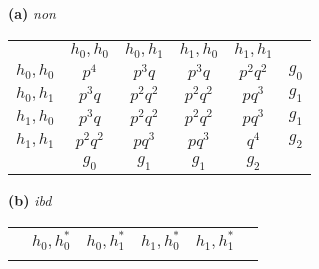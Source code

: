 \begin{table}[!h]
\begin{minipage}{0.5\textwidth}\renewcommand{\arraystretch}{1.5}
\quad\textbf{(a)} \emph{non} \\[0.25em]
\begin{tabular}[t]{c|c|c|c|c|c}
\multicolumn{1}{c}{\rule[-1.5ex]{0pt}{0pt}} &
\multicolumn{1}{c}{$h_{0}, h_{0}$} &
\multicolumn{1}{c}{$h_{0}, h_{1}$} &
\multicolumn{1}{c}{$h_{1}, h_{0}$} &
\multicolumn{1}{c}{$h_{1}, h_{1}$} &
\multicolumn{1}{c}{} \\ \cline{2-5}
\rule{0pt}{3ex}\rule[-2ex]{0pt}{0pt}
  $h_{0}, h_{0}$   & $p^{4}$       & $p^{3}q$      & $p^{3}q$      & $p^{2}q^{2}$ & $g_{0}$ \\ \cline{2-5}
\rule{0pt}{3ex}\rule[-2ex]{0pt}{0pt}
  $h_{0}, h_{1}$   & $p^{3}q$      & $p^{2}q^{2}$  & $p^{2}q^{2}$  & $pq^{3}$     & $g_{1}$ \\ \cline{2-5}
\rule{0pt}{3ex}\rule[-2ex]{0pt}{0pt}
  $h_{1}, h_{0}$   & $p^{3}q$      & $p^{2}q^{2}$  & $p^{2}q^{2}$  & $pq^{3}$     & $g_{1}$ \\ \cline{2-5}
\rule{0pt}{3ex}\rule[-2ex]{0pt}{0pt}
  $h_{1}, h_{1}$   & $p^{2}q^{2}$  & $pq^{3}$      & $pq^{3}$      & $q^{4}$      & $g_{2}$ \\ \cline{2-5}
\multicolumn{1}{c}{} &
\multicolumn{1}{c}{$g_{0}$} &
\multicolumn{1}{c}{$g_{1}$} &
\multicolumn{1}{c}{$g_{1}$} &
\multicolumn{1}{c}{$g_{2}$} &
\multicolumn{1}{c}{}
\end{tabular}
\end{minipage}
%
\begin{minipage}{0.5\textwidth}\renewcommand{\arraystretch}{1.5}
\quad\textbf{(b)} \emph{ibd} \\[0.25em]
\begin{tabular}[t]{c|c|c|c|c|c}
\multicolumn{1}{c}{\rule[-1.5ex]{0pt}{0pt}} &
\multicolumn{1}{c}{$h_{0}, h^*_{0}$} &
\multicolumn{1}{c}{$h_{0}, h^*_{1}$} &
\multicolumn{1}{c}{$h_{1}, h^*_{0}$} &
\multicolumn{1}{c}{$h_{1}, h^*_{1}$} &
\multicolumn{1}{c}{} \\ \cline{2-5}
\rule{0pt}{3ex}\rule[-2ex]{0pt}{0pt}

\end{tabular}
\end{minipage}
\end{table}
